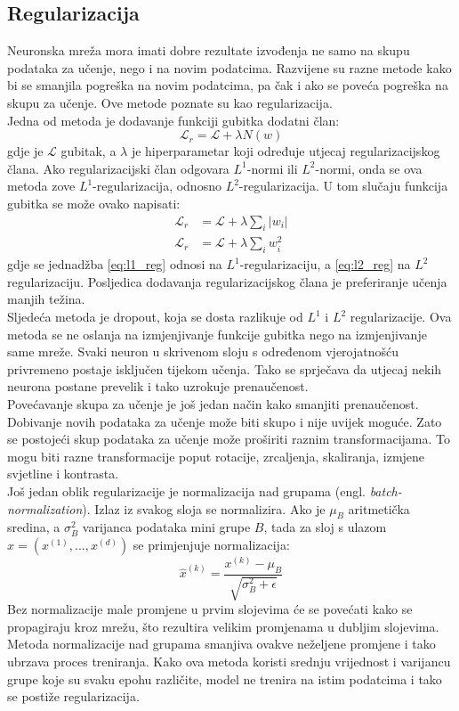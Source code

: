 \documentclass[times, utf8, zavrsni, numeric]{fer}
\begin{document}
\subsection{Regularizacija}
Neuronska mreža mora imati dobre rezultate izvođenja ne samo na skupu 
podataka za učenje, nego i na novim podatcima. Razvijene su razne metode
kako bi se smanjila pogreška na novim podatcima, pa čak i ako se poveća
pogreška na skupu za učenje. Ove metode poznate su kao regularizacija.
\\\indent Jedna od metoda je dodavanje funkciji gubitka dodatni član:
\begin{equation}
	\mathcal{L}_r = \mathcal{L} + \lambda N(w)
\end{equation}
gdje je $\mathcal{L}$ gubitak, a $\lambda$ je hiperparametar koji određuje
utjecaj regularizacijskog člana. Ako regularizacijski član odgovara
$L^1$-normi ili $L^2$-normi, onda se ova metoda zove $L^1$-regularizacija, 
odnosno $L^2$-regularizacija. U tom slučaju funkcija gubitka se može ovako
napisati:
\begin{align}
	\label{eq:l1_reg}
	\mathcal{L}_r &= \mathcal{L} + \lambda \sum_i |w_i|	 \\
	\mathcal{L}_r &= \mathcal{L} + \lambda \sum_i w_i^2
	\label{eq:l2_reg}
\end{align}
gdje se jednadžba \ref{eq:l1_reg} odnosi na $L^1$-regularizaciju, a 
\ref{eq:l2_reg} na $L^2$ regularizaciju. Posljedica dodavanja regularizacijskog
člana je preferiranje učenja manjih težina.
\\\indent Sljedeća metoda je dropout, koja se dosta razlikuje od $L^1$ i 
$L^2$ regularizacije. Ova metoda se ne oslanja na izmjenjivanje funkcije 
gubitka nego na izmjenjivanje same mreže. Svaki neuron u skrivenom sloju
s određenom vjerojatnošću privremeno postaje isključen tijekom učenja.
Tako se sprječava da utjecaj nekih neurona postane prevelik i tako uzrokuje prenaučenost.
\\\indent Povećavanje skupa za učenje je još jedan način kako smanjiti
prenaučenost. Dobivanje novih podataka za učenje može biti skupo i nije
uvijek moguće. Zato se postojeći skup podataka za učenje može proširiti
raznim transformacijama. To mogu biti razne transformacije poput rotacije,
zrcaljenja, skaliranja, izmjene svjetline i kontrasta. 
\\\indent Još jedan oblik regularizacije je normalizacija nad grupama
(engl. \textit{batch-normalization}). Izlaz iz svakog sloja se normalizira. 
Ako je $\mu_B$ aritmetička sredina, a $\sigma_B^2$ varijanca podataka mini grupe $B$, tada za sloj s ulazom $x = (x^{(1)}, ..., x^{(d)})$ se primjenjuje 
normalizacija:
\begin{equation}
	\hat{x}^{(k)} = \frac{x^{(k)} - \mu_B}{\sqrt{\sigma_B^2 + \epsilon }}
\end{equation}
Bez normalizacije male promjene u prvim slojevima će se povećati kako se 
propagiraju kroz mrežu, što rezultira velikim promjenama u dubljim slojevima.
Metoda normalizacije nad grupama smanjiva ovakve neželjene promjene i tako
ubrzava proces treniranja. Kako ova metoda koristi srednju vrijednost i 
varijancu grupe koje su svaku epohu različite, model ne trenira na istim
podatcima i tako se postiže regularizacija.
\end{document}
